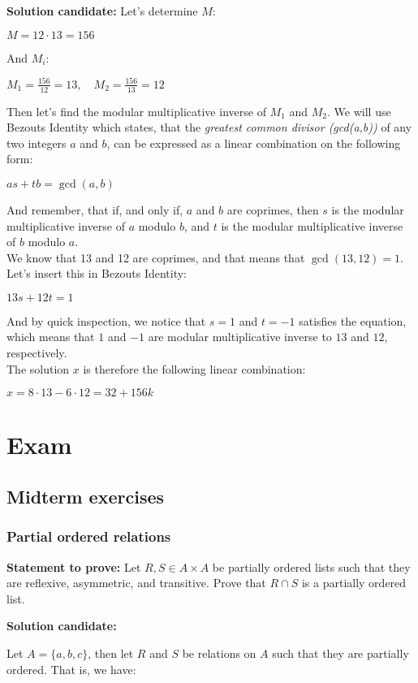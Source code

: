 \documentclass{report}
\newcommand{\cent}[1]{\begin{center}#1\end{center}}
\newcommand{\In}{\! \in \!}
\newcommand{\Prove}{\textbf{Statement to prove: }}
\newcommand{\Solution}{\textbf{Solution candidate: }}
\begin{document}
 	\Solution
 	Let's determine $M$:
 	
 	\cent{$M = 12 \cdot 13 = 156$}
 	
 	And $M_i$:
 	
 	\cent{$M_1 = \frac{156}{12} = 13, \quad M_2 = \frac{156}{13} = 12$}
 	
 	Then let's find the modular multiplicative inverse of $M_1$ and $M_2$. We will use Bezouts Identity which states, that the \textit{greatest common divisor (gcd(a,b))} of any two integers $a$ and $b$, can be expressed as a linear combination on the following form:
 	
 	\cent{$as+tb=\gcd(a,b)$}
 	
 	And remember, that if, and only if, $a$ and $b$ are coprimes, then $s$ is the modular multiplicative inverse of $a$ modulo $b$, and $t$ is the modular multiplicative inverse of $b$ modulo $a$.\\
 	
 	We know that 13 and 12 are coprimes, and that means that $\gcd(13,12) = 1$. Let's insert this in Bezouts Identity:
 	
 	\cent{$13s+12t=1$}
 	
 	And by quick inspection, we notice that $s=1$ and $t=-1$ satisfies the equation, which means that $1$ and $-1$ are modular multiplicative inverse to $13$ and $12$, respectively.\\
 	
 	The solution $x$ is therefore the following linear combination:
 	
 	\cent{$x = 8\cdot 13 - 6 \cdot 12 = 32 + 156k$}
 	
 	\chapter{Exam}
 	\pagebreak
	\section{Midterm exercises}
 	\subsection{Partial ordered relations}
	 
	\Prove
	Let $R,S\In A \times A$ be partially ordered lists such that they are reflexive, asymmetric, and transitive. Prove that $R\cap S$ is a partially ordered list.
	
	\Solution
	 
	Let $A=\{a,b,c\}$, then let $R$ and $S$ be relations on $A$ such that they are partially ordered. That is, we have:
	 
\end{document}
